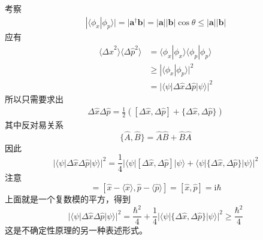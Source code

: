 \documentclass[12pt]{article}
\begin{document}
    考察
    \begin{equation}\begin{aligned}
        |\langle \phi_x | \phi_p \rangle| = |\bm{a}^\dagger \bm{b}| = |\bm{a}||\bm{b}|\cos{\theta} \leqslant |\bm{a}||\bm{b}|
    \end{aligned}\end{equation}
    应有
    \begin{equation}\begin{aligned}
        \langle \Delta \hat{x}^2\rangle\langle \Delta \hat{p}^2\rangle &= \langle \phi_x | \phi_x \rangle \langle \phi_p | \phi_p \rangle\\ &\geqslant |\langle \phi_x|\phi_p \rangle|^2\\
        &= |\langle \psi |\Delta \hat{x} \Delta \hat{p}|\psi \rangle|^2
    \end{aligned}\end{equation}
    所以只需要求出
    \begin{equation}\begin{aligned}
        \Delta \hat{x} \Delta \hat{p} = \frac 12([\Delta \hat{x}, \Delta \hat{p}] + \{\Delta \hat{x}, \Delta \hat{p}\})
    \end{aligned}\end{equation}
    其中反对易关系
    \begin{equation}
        \{\hat{A}, \hat{B}\} = \hat{A}\hat{B} + \hat{B}\hat{A}
    \end{equation}
    因此
    \begin{equation}
        |\langle \psi |\Delta \hat{x} \Delta \hat{p}|\psi \rangle|^2 = \frac 14 |\langle \psi |[\Delta \hat{x},\Delta \hat{p}]|\psi \rangle + \langle \psi |\{\Delta \hat{x},\Delta \hat{p}\}|\psi \rangle|^2
    \end{equation}
    注意
    \begin{equation}
        [\Delta \hat{x},\Delta \hat{p}] = [\hat{x}-\langle \hat{x} \rangle, \hat{p}-\langle \hat{p} \rangle ] = [\hat{x},\hat{p}] = \mathrm{i}\hbar
    \end{equation}
    上面就是一个复数模的平方，得到
    \begin{equation}
        |\langle \psi |\Delta \hat{x} \Delta \hat{p}|\psi \rangle|^2 = \frac {\hbar^2}4 + \frac 14 |\langle \psi |\{\Delta \hat{x},\Delta \hat{p}\}|\psi \rangle|^2 \geqslant \frac {\hbar^2}4
    \end{equation}
    这是不确定性原理的另一种表述形式。
\end{document}
